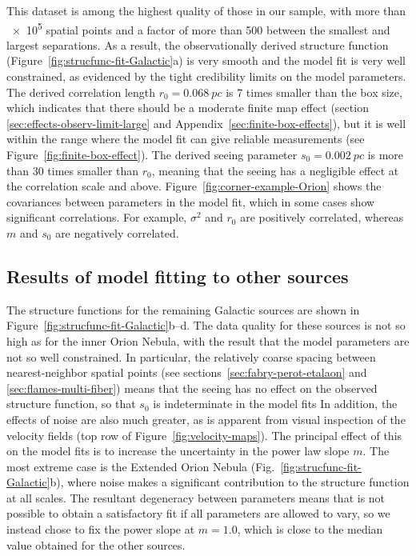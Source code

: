 \documentclass[fleqn,usenatbib, useAMS, a4paper]{mnras}
\begin{document}
This dataset is among the highest quality of those in our sample,
with more than \num{e5} spatial points and a factor of more than \num{500}
between the smallest and largest separations.
As a result, the observationally derived structure function (Figure~\ref{fig:strucfunc-fit-Galactic}a)
is very smooth and the model fit is very well constrained,
as evidenced by the tight credibility limits on the model parameters.
The derived correlation length \(r_0 = \SI{0.068}{pc}\) is \num{7} times smaller
than the box size, which indicates that there should be a moderate finite map effect
(section \ref{sec:effects-observ-limit-large} and Appendix~\ref{sec:finite-box-effects}),
but it is well within the range where the model fit can give reliable measurements
(see Figure~\ref{fig:finite-box-effect}).
The derived seeing parameter \(s_0 = \SI{0.002}{pc}\) is more than \num{30} times smaller
than \(r_0\), meaning that the seeing has a negligible effect at the correlation scale and above.
Figure~\ref{fig:corner-example-Orion}  shows  the covariances  between
parameters  in the  model fit,
which in some cases show significant correlations.
For example, \(\sigma^2\) and \(r_0\) are positively correlated,
whereas \(m\) and \(s_0\) are negatively correlated. 

\subsection{Results of model fitting to other sources}
\label{sec:results-model-fitt}

The structure functions for the remaining Galactic sources
are shown in Figure~\ref{fig:strucfunc-fit-Galactic}b--d.
The data quality for these sources is not so high as for the inner Orion Nebula,
with the result that the model parameters are not so well constrained.
In particular, the relatively coarse spacing between nearest-neighbor spatial points
(see sections~\ref{sec:fabry-perot-etalaon} and \ref{sec:flames-multi-fiber})
means that the seeing has no effect on the observed structure function,
so that \(s_0\) is indeterminate in the model fits
In addition, the effects of noise are also much greater,
as is apparent from visual inspection of the velocity fields
(top row of Figure~\ref{fig:velocity-maps}).
The principal effect of this on the model fits is to increase the uncertainty
in the power law slope \(m\).
The most extreme case is the Extended Orion Nebula (Fig.~\ref{fig:strucfunc-fit-Galactic}b),
where noise makes a significant contribution to the structure function at all scales.
The resultant degeneracy between parameters means that
is not possible to obtain a satisfactory fit
if all parameters are allowed to vary,
so we instead chose to fix the power slope at \(m = 1.0\),
which is close to the median value obtained for the other sources.
\end{document}
